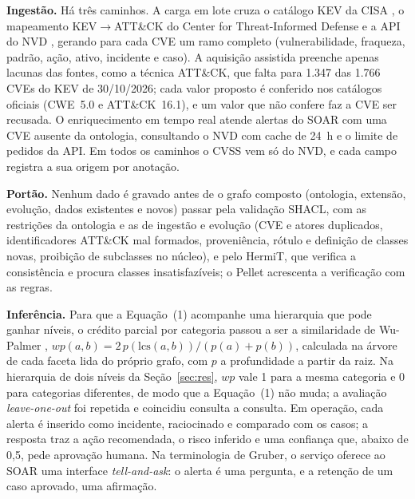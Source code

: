 \documentclass[12pt]{article}
\begin{document}
\textbf{Ingestão.} Há três caminhos. A carga em lote cruza o catálogo KEV da CISA \cite{cisakev}, o mapeamento KEV$\rightarrow$ATT\&CK do Center for Threat-Informed Defense \cite{ctidkev,strom2018attack} e a API do NVD \cite{nvd}, gerando para cada CVE um ramo completo (vulnerabilidade, fraqueza, padrão, ação, ativo, incidente e caso). A aquisição assistida preenche apenas lacunas das fontes, como a técnica ATT\&CK, que falta para 1.347 das 1.766 CVEs do KEV de 30/10/2026; cada valor proposto é conferido nos catálogos oficiais (CWE~5.0 e ATT\&CK~16.1), e um valor que não confere faz a CVE ser recusada. O enriquecimento em tempo real atende alertas do SOAR com uma CVE ausente da ontologia, consultando o NVD com cache de 24~h e o limite de pedidos da API. Em todos os caminhos o CVSS vem só do NVD, e cada campo registra a sua origem por anotação.

\textbf{Portão.} Nenhum dado é gravado antes de o grafo composto (ontologia, extensão, evolução, dados existentes e novos) passar pela validação SHACL, com as restrições da ontologia e as de ingestão e evolução (CVE e atores duplicados, identificadores ATT\&CK mal formados, proveniência, rótulo e definição de classes novas, proibição de subclasses no núcleo), e pelo HermiT, que verifica a consistência e procura classes insatisfazíveis; o Pellet acrescenta a verificação com as regras.

\textbf{Inferência.} Para que a Equação~(1) acompanhe uma hierarquia que pode ganhar níveis, o crédito parcial por categoria passou a ser a similaridade de Wu-Palmer \cite{wupalmer1994}, $wp(a,b) = 2\,p(\mathrm{lcs}(a,b))/(p(a)+p(b))$, calculada na árvore de cada faceta lida do próprio grafo, com $p$ a profundidade a partir da raiz. Na hierarquia de dois níveis da Seção~\ref{sec:res}, $wp$ vale 1 para a mesma categoria e 0 para categorias diferentes, de modo que a Equação~(1) não muda; a avaliação \emph{leave-one-out} foi repetida e coincidiu consulta a consulta. Em operação, cada alerta é inserido como incidente, raciocinado e comparado com os casos; a resposta traz a ação recomendada, o risco inferido e uma confiança que, abaixo de 0,5, pede aprovação humana. Na terminologia de Gruber, o serviço oferece ao SOAR uma interface \emph{tell-and-ask}: o alerta é uma pergunta, e a retenção de um caso aprovado, uma afirmação.
\end{document}

